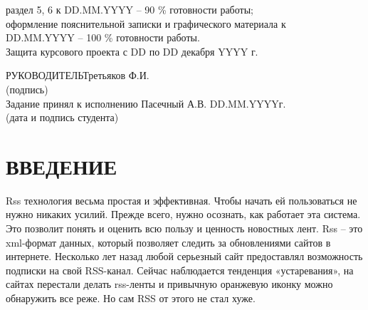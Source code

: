 \documentclass[14pt,a4paper]{extreport}
\begin{document}
\begin{enumerate}
	\underline{\hspace*{16cm}}\hspace*{-16cm}раздел 5, 6 к DD.MM.YYYY  –  90 \% готовности работы;\\
	\underline{\hspace*{16cm}}\hspace*{-16cm}оформление пояснительной записки и графического материала к\\
	\underline{\hspace*{16cm}}\hspace*{-16cm}DD.MM.YYYY – 100 \% готовности работы.\\
	\underline{\hspace*{16cm}}\hspace*{-16cm}Защита курсового проекта с DD по DD декабря YYYY г.\\
	\end{enumerate}
	\hspace*{7cm}РУКОВОДИТЕЛЬ\underline{\hspace*{6cm}}\hspace*{-3.9cm}Третьяков Ф.И.\\
	\hspace*{11.5cm}\small (подпись) \normalsize\\
	\bigskip
	Задание принял к исполнению \underline{\hspace*{10.5cm}}\hspace*{-8cm}Пасечный А.В. DD.MM.YYYYг.\\
	\hspace*{7cm}\small (дата и подпись студента) \normalsize\\
	\newpage
	\pagestyle{plain}
	
	\renewcommand\contentsname{\center\normalsize \textbf{СОДЕРЖАНИЕ} \endcenter}
	\tableofcontents
	\endcenter
	



	\newpage
	\section*{\center\normalsize ВВЕДЕНИЕ \endcenter}
	\hspace{4ex}Rss технология весьма простая и эффективная. Чтобы начать ей пользоваться не нужно никаких усилий. Прежде всего, нужно осознать, как работает эта система. Это позволит понять и оценить всю пользу и ценность новостных лент.
Rss – это xml-формат данных, который позволяет следить за обновлениями сайтов в интернете. Несколько лет назад любой серьезный сайт предоставлял возможность подписки на свой RSS-канал. Сейчас наблюдается тенденция «устаревания», на сайтах перестали делать rss-ленты и привычную оранжевую иконку можно обнаружить все реже.   Но сам RSS от этого не стал хуже.
\end{document}
